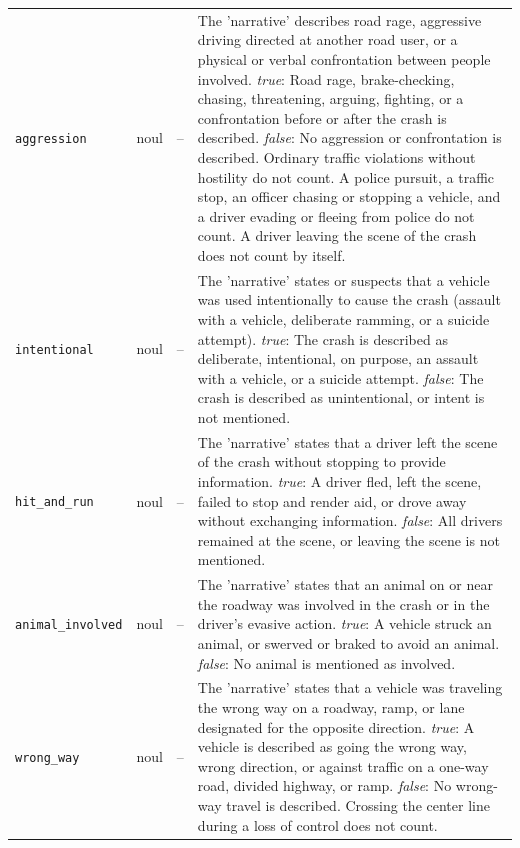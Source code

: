\begin{small}
\begin{longtable}{lrr>{\raggedright\arraybackslash}p{267.2pt}}
\texttt{aggression} & noul & -- & The 'narrative' describes road rage, aggressive driving directed at another road user, or a physical or verbal confrontation between people involved. \newline \textit{true}: Road rage, brake-checking, chasing, threatening, arguing, fighting, or a confrontation before or after the crash is described. \newline \textit{false}: No aggression or confrontation is described. Ordinary traffic violations without hostility do not count. A police pursuit, a traffic stop, an officer chasing or stopping a vehicle, and a driver evading or fleeing from police do not count. A driver leaving the scene of the crash does not count by itself. \\
\texttt{intentional} & noul & -- & The 'narrative' states or suspects that a vehicle was used intentionally to cause the crash (assault with a vehicle, deliberate ramming, or a suicide attempt). \newline \textit{true}: The crash is described as deliberate, intentional, on purpose, an assault with a vehicle, or a suicide attempt. \newline \textit{false}: The crash is described as unintentional, or intent is not mentioned. \\
\texttt{hit\_and\_run} & noul & -- & The 'narrative' states that a driver left the scene of the crash without stopping to provide information. \newline \textit{true}: A driver fled, left the scene, failed to stop and render aid, or drove away without exchanging information. \newline \textit{false}: All drivers remained at the scene, or leaving the scene is not mentioned. \\
\texttt{animal\_involved} & noul & -- & The 'narrative' states that an animal on or near the roadway was involved in the crash or in the driver's evasive action. \newline \textit{true}: A vehicle struck an animal, or swerved or braked to avoid an animal. \newline \textit{false}: No animal is mentioned as involved. \\
\texttt{wrong\_way} & noul & -- & The 'narrative' states that a vehicle was traveling the wrong way on a roadway, ramp, or lane designated for the opposite direction. \newline \textit{true}: A vehicle is described as going the wrong way, wrong direction, or against traffic on a one-way road, divided highway, or ramp. \newline \textit{false}: No wrong-way travel is described. Crossing the center line during a loss of control does not count. \\

\end{longtable}
\end{small}
